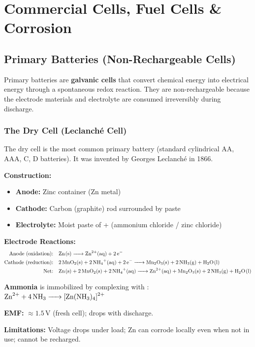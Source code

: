 \chapter{Commercial Cells, Fuel Cells \& Corrosion}
\label{chap:commercial_cells}

\section{Primary Batteries (Non-Rechargeable Cells)}

Primary batteries are \textbf{galvanic cells} that convert chemical energy into electrical energy through a spontaneous redox reaction. They are non-rechargeable because the electrode materials and electrolyte are consumed irreversibly during discharge.

\subsection{The Dry Cell (Leclanch\'{e} Cell)}

The dry cell is the most common primary battery (standard cylindrical AA, AAA, C, D batteries). It was invented by Georges Leclanch\'{e} in 1866.

\begin{conceptbox}
\textbf{Construction:}
\begin{itemize}
    \item \textbf{Anode:} Zinc container (Zn metal)
    \item \textbf{Cathode:} Carbon (graphite) rod surrounded by  paste
    \item \textbf{Electrolyte:} Moist paste of  +  (ammonium chloride / zinc chloride)
\end{itemize}

\textbf{Electrode Reactions:}
\begin{align*}
\text{Anode (oxidation):}& \quad \ce{Zn(s) -> Zn^2+(aq) + 2e-}\\
\text{Cathode (reduction):}& \quad \ce{2MnO2(s) + 2NH4+(aq) + 2e- -> Mn2O3(s) + 2NH3(g) + H2O(l)}\\
\text{Net:}& \quad \ce{Zn(s) + 2MnO2(s) + 2NH4+(aq) -> Zn^2+(aq) + Mn2O3(s) + 2NH3(g) + H2O(l)}
\end{align*}

\textbf{Ammonia} is immobilized by complexing with : $\ce{Zn^2+ + 4NH3 -> [Zn(NH3)4]^2+}$

\textbf{EMF:} $\approx 1.5\,\text{V}$ (fresh cell); drops with discharge.

\textbf{Limitations:} Voltage drops under load; Zn can corrode locally even when not in use; cannot be recharged.
\end{conceptbox}

